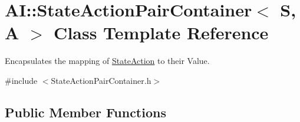 \hypertarget{classAI_1_1StateActionPairContainer}{\section{A\+I\+:\+:State\+Action\+Pair\+Container$<$ S, A $>$ Class Template Reference}
\label{classAI_1_1StateActionPairContainer}
}


Encapsulates the mapping of \hyperlink{classAI_1_1StateAction}{State\+Action} to their Value.  




{\ttfamily \#include $<$State\+Action\+Pair\+Container.\+h$>$}

\subsection*{Public Member Functions}
